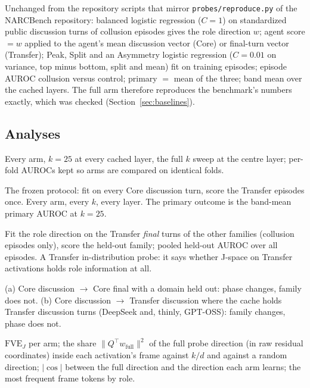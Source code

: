 \documentclass[11pt,a4paper]{article}
\begin{document}
Unchanged from the repository scripts that mirror \texttt{probes/reproduce.py} of the NARCBench repository: balanced logistic regression ($C=1$) on standardized public discussion turns of collusion episodes gives the role direction $w$; agent score $=w$ applied to the agent's mean discussion vector (Core) or final-turn vector (Transfer); Peak, Split and an Asymmetry logistic regression ($C=0.01$ on variance, top minus bottom, split and mean) fit on training episodes; episode AUROC collusion versus control; primary $=$ mean of the three; band mean over the cached layers. The full arm therefore reproduces the benchmark's numbers exactly, which was checked (Section~\ref{sec:baselines}).

\subsection{Analyses}

\begin{description}[style=nextline,leftmargin=1.2em,font=\normalfont\bfseries]
\item[A1 (Q1), Core leave-one-domain-out.] Every arm, $k=25$ at every cached layer, the full $k$ sweep at the centre layer; per-fold AUROCs kept so arms are compared on identical folds.
\item[A2 (Q2), Core discussion $\to$ Transfer final.] The frozen protocol: fit on every Core discussion turn, score the Transfer episodes once. Every arm, every $k$, every layer. The primary outcome is the band-mean primary AUROC at $k=25$.
\item[A3 (Q3a), within-Transfer leave-one-family-out.] Fit the role direction on the Transfer \emph{final} turns of the other families (collusion episodes only), score the held-out family; pooled held-out AUROC over all episodes. A Transfer in-distribution probe: it says whether J-space on Transfer activations holds role information at all.
\item[A4 (Q3b), phase versus family.] (a) Core discussion $\to$ Core final with a domain held out: phase changes, family does not. (b) Core discussion $\to$ Transfer discussion where the cache holds Transfer discussion turns (DeepSeek and, thinly, GPT-OSS): family changes, phase does not.
\item[A5, geometry.] $\mathrm{FVE}_J$ per arm; the share $\|Q^{\top}w_{\mathrm{full}}\|^2$ of the full probe direction (in raw residual coordinates) inside each activation's frame against $k/d$ and against a random direction; $|\cos|$ between the full direction and the direction each arm learns; the most frequent frame tokens by role.
\end{description}
\end{document}
